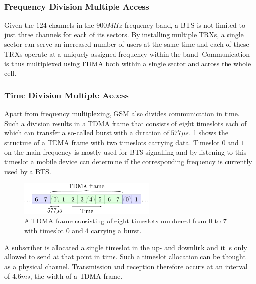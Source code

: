 \subsubsection{Frequency Division Multiple Access}
Given the $124$ channels in the $900\si{MHz}$ frequency band, a
\gls{BTS} is not limited to just three channels for each of its
sectors. By installing multiple \glspl{TRX}, a single sector can serve
an increased number of users at the same time and each of these
\glspl{TRX} operate at a uniquely assigned frequency within the
band. Communication is thus multiplexed using \gls{FDMA} both within a
single sector and across the whole cell.

\subsubsection{Time Division Multiple Access}
Apart from frequency multiplexing, \gls{GSM} also divides
communication in time. Such a division results in a \gls{TDMA} frame
that consists of eight timeslots each of which can transfer a
so-called burst with a duration of $577\si{\mu s}$.
\cref{fig:tdma_frame} shows the structure of a \gls{TDMA} frame with
two timeslots carrying data. Timeslot $0$ and $1$ on the main
frequency is mostly used for \gls{BTS} signalling and by listening to
this timeslot a mobile device can determine if the corresponding
frequency is currently used by a \gls{BTS}.\

\begin{figure}[H]
  \centering
  \includegraphics[width=0.6\textwidth]{figures/tdma_frame}
  \caption{A TDMA frame consisting of eight timeslots numbered from
    $0$ to $7$ with timeslot $0$ and $4$ carrying a burst.}
  \label{fig:tdma_frame}
\end{figure}

A subscriber is allocated a single timeslot in the up- and downlink
and it is only allowed to send at that point in time. Such a timeslot
allocation can be thought as a physical channel. Transmission and
reception therefore occurs at an interval of $4.6\si{ms}$, the width
of a \gls{TDMA} frame.

